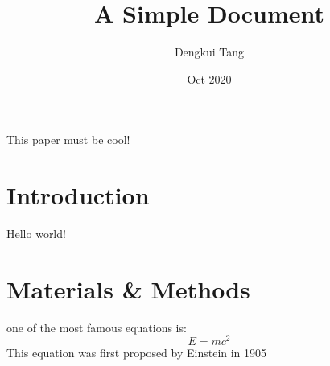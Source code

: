 \documentclass[12pt]{article}
\title{A Simple Document}
\author{Dengkui Tang}
\date{Oct 2020}
\begin{document}
  \maketitle

  \begin{Abstract}
    This paper must be cool!
  \end{Abstract}

  \section{Introduction}
    Hello world!

  \section{Materials \& Methods}
  one of the most famous equations is:
  \begin{equation}
    E = mc^2
  \end{equation}
  This equation was first proposed by Einstein in 1905
  \cite{einstein1905does}

  
\end{document}
